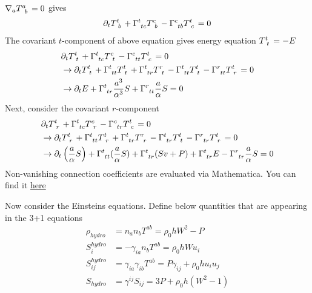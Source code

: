 \documentclass[prd]{revtex4}
\newcommand*\apost{\textsc{\char13}}
\begin{document}
$\nabla_a T\indices{^a_b}=0$ gives
\begin{align}
\partial_t T\indices{^t_b} + \Gamma\indices{^t_{tc}}T\indices{^c_b} - \Gamma\indices{^c_{tb}}T\indices{^t_c} = 0
\end{align}
The covariant $t$-component of above equation gives energy equation $T\indices{^t_t} = - E$
\begin{align}
&\partial_t T\indices{^t_t} + \Gamma\indices{^t_{tc}}T\indices{^c_t} - \Gamma\indices{^c_{tt}}T\indices{^t_c} = 0 \nonumber \\
&\rightarrow \partial_t T\indices{^t_t} + \Gamma\indices{^t_{tt}}T\indices{^t_t} +\Gamma\indices{^t_{tr}}T\indices{^r_t}- \Gamma\indices{^t_{tt}}T\indices{^t_t} - \Gamma\indices{^r_{tt}}T\indices{^t_r} = 0 \nonumber \\
&\rightarrow \partial_t E + \Gamma\indices{^t_{tr}} \frac{a^3}{\alpha^3} S + \Gamma\indices{^r_{tt}} \frac{a}{\alpha} S = 0
\end{align}
Next, consider the covariant $r$-component 
\begin{align}
&\partial_t T\indices{^t_r} + \Gamma\indices{^t_{tc}}T\indices{^c_r} - \Gamma\indices{^c_{tr}}T\indices{^t_c} = 0 \nonumber \\
&\rightarrow \partial_t T\indices{^t_r} + \Gamma\indices{^t_{tt}}T\indices{^t_r} +\Gamma\indices{^t_{tr}}T\indices{^r_r}- \Gamma\indices{^t_{tr}}T\indices{^t_t} - \Gamma\indices{^r_{tr}}T\indices{^t_r} = 0 \nonumber \\
&\rightarrow \partial_t \left(\frac{a}{\alpha} S\right) + \Gamma\indices{^t_{tt}}(\frac{a}{\alpha} S)  +\Gamma\indices{^t_{tr}}(Sv+P) + \Gamma\indices{^t_{tr}}E - \Gamma\indices{^r_{tr}}\frac{a}{\alpha} S= 0 \nonumber 
\end{align}
Non-vanishing connection coefficients are evaluated via Mathematica. You can find it \href{https://github.com/hlim88/PBH-NS/tree/master/tools}{here}



Now consider the Einstein\apost s equations. Define below quantities that are appearing in the 3+1 equations
\begin{align}
\rho_{hydro} &= n_a n_b T^{ab} = \rho_0 h W^2 - P \\
S_i^{hydro} &= - \gamma_{ia} n_b T^{ab}  = \rho_0 h W u_i \\
S_{ij}^{hydro} &= \gamma_{ia} \gamma_{ib} T^{ab} = P \gamma_{ij} + \rho_0 h u_i u_j \\
S_{hydro} &= \gamma^{ij} S_{ij} = 3 P + \rho_0 h (W^2 -1)
\end{align}
\end{document}
